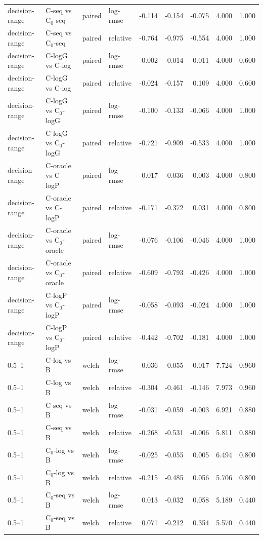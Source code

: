 \begin{longtable}{llllrrrrr}
decision-range & C-seq vs C$_0$-seq & paired & log-rmse & -0.114 & -0.154 & -0.075 & 4.000 & 1.000 \\
decision-range & C-seq vs C$_0$-seq & paired & relative & -0.764 & -0.975 & -0.554 & 4.000 & 1.000 \\
decision-range & C-logG vs C-log & paired & log-rmse & -0.002 & -0.014 & 0.011 & 4.000 & 0.600 \\
decision-range & C-logG vs C-log & paired & relative & -0.024 & -0.157 & 0.109 & 4.000 & 0.600 \\
decision-range & C-logG vs C$_0$-logG & paired & log-rmse & -0.100 & -0.133 & -0.066 & 4.000 & 1.000 \\
decision-range & C-logG vs C$_0$-logG & paired & relative & -0.721 & -0.909 & -0.533 & 4.000 & 1.000 \\
decision-range & C-oracle vs C-logP & paired & log-rmse & -0.017 & -0.036 & 0.003 & 4.000 & 0.800 \\
decision-range & C-oracle vs C-logP & paired & relative & -0.171 & -0.372 & 0.031 & 4.000 & 0.800 \\
decision-range & C-oracle vs C$_0$-oracle & paired & log-rmse & -0.076 & -0.106 & -0.046 & 4.000 & 1.000 \\
decision-range & C-oracle vs C$_0$-oracle & paired & relative & -0.609 & -0.793 & -0.426 & 4.000 & 1.000 \\
decision-range & C-logP vs C$_0$-logP & paired & log-rmse & -0.058 & -0.093 & -0.024 & 4.000 & 1.000 \\
decision-range & C-logP vs C$_0$-logP & paired & relative & -0.442 & -0.702 & -0.181 & 4.000 & 1.000 \\
0.5–1 & C-log vs B & welch & log-rmse & -0.036 & -0.055 & -0.017 & 7.724 & 0.960 \\
0.5–1 & C-log vs B & welch & relative & -0.304 & -0.461 & -0.146 & 7.973 & 0.960 \\
0.5–1 & C-seq vs B & welch & log-rmse & -0.031 & -0.059 & -0.003 & 6.921 & 0.880 \\
0.5–1 & C-seq vs B & welch & relative & -0.268 & -0.531 & -0.006 & 5.811 & 0.880 \\
0.5–1 & C$_0$-log vs B & welch & log-rmse & -0.025 & -0.055 & 0.005 & 6.494 & 0.800 \\
0.5–1 & C$_0$-log vs B & welch & relative & -0.215 & -0.485 & 0.056 & 5.706 & 0.800 \\
0.5–1 & C$_0$-seq vs B & welch & log-rmse & 0.013 & -0.032 & 0.058 & 5.189 & 0.440 \\
0.5–1 & C$_0$-seq vs B & welch & relative & 0.071 & -0.212 & 0.354 & 5.570 & 0.440 \\

\end{longtable}
